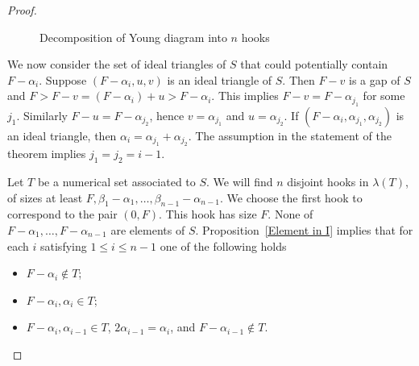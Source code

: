 \documentclass{amsproc}
\theoremstyle{definition}
\theoremstyle{remark}
\numberwithin{equation}{section}
\begin{document}
\begin{proof}
\begin{center}
\begin{figure}
\caption{Decomposition of Young diagram into $n$ hooks}
\end{figure}
\end{center}

We now consider the set of ideal triangles of $S$ that could potentially contain $F-\alpha_i$. Suppose $(F-\alpha_i,u,v)$ is an ideal triangle of $S$. Then $F-v$ is a gap of $S$ and $F>F-v=(F-\alpha_i)+u>F-\alpha_i$. This implies $F-v=F-\alpha_{j_1}$ for some $j_1$. Similarly $F-u=F-\alpha_{j_2}$, hence $v=\alpha_{j_1}$ and $u=\alpha_{j_2}$. If $(F-\alpha_i,\alpha_{j_1},\alpha_{j_2})$ is an ideal triangle,  then $\alpha_i=\alpha_{j_1}+\alpha_{j_2}$. The assumption in the statement of the theorem implies $j_1=j_2=i-1$.

Let $T$ be a numerical set associated to $S$.
We will find $n$ disjoint hooks in $\lambda(T)$, of sizes at least $F, \beta_1-\alpha_1,\dots,\beta_{n-1}-\alpha_{n-1}$. We choose the first hook to correspond to the pair $(0,F)$. This hook has size $F$.
None of $F-\alpha_1,\ldots, F-\alpha_{n-1}$ are elements of $S$. Proposition~\ref{Element in I} implies that for each $i$ satisfying $1\le i \le n-1$ one of the following holds 
\begin{itemize}
\item $F-\alpha_i\notin T$;
\item $F-\alpha_i,\alpha_i\in T$;
\item $F- \alpha_i, \alpha_{i-1} \in T$, $2\alpha_{i-1} = \alpha_i$, and $F-\alpha_{i-1} \not\in T$.
\end{itemize}


\end{proof}
\end{document}
